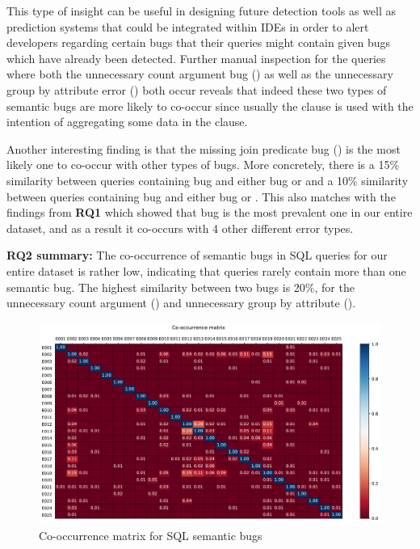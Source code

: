 This type of insight can be useful in designing future detection tools as well as prediction systems that could be integrated within IDEs in order to alert developers regarding certain bugs that their queries might contain given bugs which have already been detected. Further manual inspection for the queries where both the unnecessary count argument bug () as well as the unnecessary group by attribute error () both occur reveals that indeed these two types of semantic bugs are more likely to co-occur since usually the  clause is used with the intention of aggregating some data in the  clause.

Another interesting finding is that the missing join predicate bug () is the most likely one to co-occur with other types of bugs. More concretely, there is a 15\% similarity between queries containing bug  and either bug  or  and a 10\% similarity between queries containing bug  and either bug  or . This also matches with the findings from \textbf{RQ1} which showed that bug  is the most prevalent one in our entire dataset, and as a result it co-occurs with 4 other different error types. 

\begin{mdframed}[default]
\noindent \textbf{RQ2 summary:} The co-occurrence of semantic bugs in SQL queries for our entire dataset is rather low, indicating that queries rarely contain more than one semantic bug. The highest similarity between two bugs is 20\%, for the unnecessary count argument () and unnecessary group by attribute ().
\end{mdframed}

\begin{figure}[ht]
    \centering
    \includegraphics[width=1.1\textwidth]{img/matrix_combined.pdf}
    \caption{Co-occurrence matrix for SQL semantic bugs}
    \label{fig:matrix}
\end{figure}

